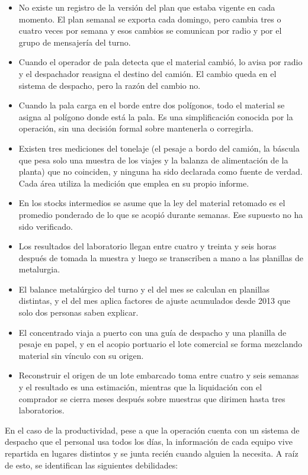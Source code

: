 \documentclass[anexo]{../../comun/overfore}
\begin{document}
\begin{itemize}
\item No existe un registro de la versión del plan que estaba vigente en cada momento. El plan semanal se exporta cada domingo, pero cambia tres o cuatro veces por semana y esos cambios se comunican por radio y por el grupo de mensajería del turno.
\item Cuando el operador de pala detecta que el material cambió, lo avisa por radio y el despachador reasigna el destino del camión. El cambio queda en el sistema de despacho, pero la razón del cambio no.
\item Cuando la pala carga en el borde entre dos polígonos, todo el material se asigna al polígono donde está la pala. Es una simplificación conocida por la operación, sin una decisión formal sobre mantenerla o corregirla.
\item Existen tres mediciones del tonelaje (el pesaje a bordo del camión, la báscula que pesa solo una muestra de los viajes y la balanza de alimentación de la planta) que no coinciden, y ninguna ha sido declarada como fuente de verdad. Cada área utiliza la medición que emplea en su propio informe.
\item En los stocks intermedios se asume que la ley del material retomado es el promedio ponderado de lo que se acopió durante semanas. Ese supuesto no ha sido verificado.
\item Los resultados del laboratorio llegan entre cuatro y treinta y seis horas después de tomada la muestra y luego se transcriben a mano a las planillas de metalurgia.
\item El balance metalúrgico del turno y el del mes se calculan en planillas distintas, y el del mes aplica factores de ajuste acumulados desde 2013 que solo dos personas saben explicar.
\item El concentrado viaja a puerto con una guía de despacho y una planilla de pesaje en papel, y en el acopio portuario el lote comercial se forma mezclando material sin vínculo con su origen.
\item Reconstruir el origen de un lote embarcado toma entre cuatro y seis semanas y el resultado es una estimación, mientras que la liquidación con el comprador se cierra meses después sobre muestras que dirimen hasta tres laboratorios.
\end{itemize}

En el caso de la productividad, pese a que la operación cuenta con un sistema de despacho que el personal usa todos los días, la información de cada equipo vive repartida en lugares distintos y se junta recién cuando alguien la necesita. A raíz de esto, se identifican las siguientes debilidades:
\end{document}
